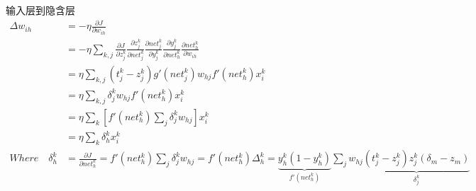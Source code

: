 \documentclass[a4paper,11pt,onecolumn,oneside,UTF8]{article}
\begin{document}
\begin{enumerate}
$$          $$
          输入层到隐含层
          $$
              \begin{aligned}
                  \Delta w_{ih}          & =-\eta\frac{\partial J}{\partial w_{ih}}                                                                                                                                                                                                                                                           \\
                                         & =-\eta\sum\limits_{k,j}\frac{\partial J}{\partial z_{j}^k}\frac{\partial z_{j}^k}{\partial net_{j}^k}\frac{\partial net_{j}^k}{\partial y_{j}^k}\frac{\partial y_{j}^k}{\partial net_{h}^k}\frac{\partial net_{h}^k}{\partial w_{ih}}                                                              \\
                                         & =\eta\sum\limits_{k,j}\left(t_j^k-z_j^k\right)g'\left(net_j^k\right)w_{hj}f'\left(net_h^k\right)x_i^k                                                                                                                                                                                              \\
                                         & =\eta\sum\limits_{k,j}\delta_j^kw_{hj}f'\left(net_h^k\right)x_i^k                                                                                                                                                                                                                                  \\
                                         & =\eta\sum\limits_{k}\left[f'\left(net_h^k\right)\sum\limits_{j}\delta_j^kw_{hj}\right]x_i^k                                                                                                                                                                                                        \\
                                         & =\eta\sum\limits_{k}\delta_h^kx_i^k                                                                                                                                                                                                                                                                \\
                  Where \quad \delta_h^k & =\frac{\partial J}{\partial net_{h}^k}=f'\left(net_h^k\right)\sum\limits_{j}\delta_j^kw_{hj}=f'\left(net_h^k\right)\Delta_h^k=\underbrace{y_h^k\left(1-y_h^k\right)}_{f'\left(net_h^k\right)}\sum\limits_{j}w_{hj}\underbrace{\left(t_j^k-z_j^k\right)z_j^k\left(\delta_m-z_m\right)}_{\delta_j^k}

\end{aligned}$$
\end{enumerate}
\end{document}
